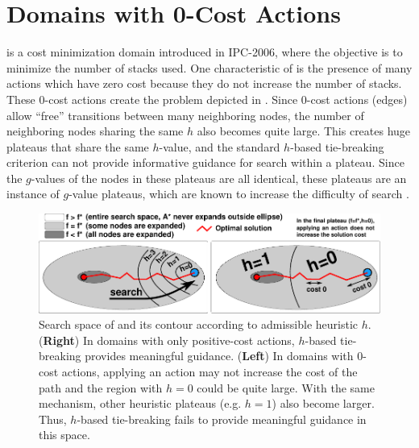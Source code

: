 \section{Domains with 0-Cost Actions}
\label{sec:zerocost-domains}
  is a cost
minimization domain introduced in IPC-2006, where the objective is to 
minimize the number of stacks used.
One characteristic of  is the presence of many  actions which have zero cost because they do not increase the number of stacks. These 0-cost actions create the problem depicted in .
Since 0-cost actions (edges) allow ``free'' transitions between many neighboring nodes,
the number of neighboring nodes sharing the same $h$ also becomes quite large.
This creates huge plateaus that share the same $h$-value, and the standard $h$-based tie-breaking criterion can not provide informative guidance for search within a plateau.
Since the $g$-values of the nodes in these plateaus are all identical, these plateaus are an instance of $g$-value plateaus, which are known to increase the difficulty of search \cite{benton2010g}.

\begin{figure}[htbp]
  \centering
  \includegraphics{img/astar/plateau-1.pdf}
 \caption{Search space of \astar and its contour according to admissible heuristic $h$. (\textbf{Right}) In domains with only positive-cost actions, $h$-based tie-breaking provides meaningful guidance. (\textbf{Left}) In domains with 0-cost actions, applying an action may not increase the cost of the path and the region with $h=0$ could be quite large. With the same mechanism, other heuristic plateaus (e.g. $h=1$) also become larger. Thus, $h$-based tie-breaking fails to provide meaningful guidance in this space.
  }
 \label{fig:plateau-1}
\end{figure}


